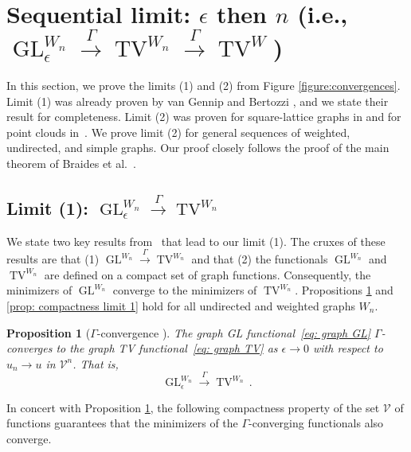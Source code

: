 \documentclass[11pt]{amsart}
\newtheorem{proposition}{Proposition}[section]
\def\ep{\epsilon}
\def\calV{\mathcal{V}}
\def\ra{\rightarrow}
\def\gamra{\stackrel{\Gamma}{\longrightarrow}}
\def\GL{\operatorname{GL}}
\def\TV{\operatorname{TV}}
\numberwithin{equation}{section}
\begin{document}
{{%

\section{\texorpdfstring{Sequential limit: $\ep$ then $n$ (i.e., $\GL^{W_n}_\ep \gamra \TV^{W_n} \gamra \TV^W$)}{Sequential limit: ep then n}}\label{sec: sequential ep then n}

In this section, we prove the limits (1) and (2) from Figure \ref{figure:convergences}. Limit (1) was already proven by van Gennip and Bertozzi \cite[Theorem 3.1]{van2012gamma}, and we state their result for completeness. Limit (2) was proven {for} square-lattice graphs in \cite[Theorem 4.3]{van2012gamma} and for point clouds in~\cite{garcia2016continuum}. We {prove limit (2) for} general sequences of {weighted, undirected, and simple} graphs. Our proof closely follows the proof of the main theorem of {Braides et al.}~\cite{braides2020cut}. 



\subsection{\texorpdfstring{Limit (1): $\GL^{W_n}_\ep \gamra \TV^{W_n}$}{Limit (1)}}

We state two key results from~\cite{van2012gamma} that lead to
our limit (1). The cruxes of these results are that (1) $\GL^{W_n} \gamra \TV^{W_n}$ and that (2) the functionals $\GL^{W_n}$ and $\TV^{W_n}$ are defined on a compact set of graph functions. Consequently, the minimizers of $\GL^{W_n}$ converge to the minimizers of $\TV^{W_n}$. 
Propositions \ref{prop: limit 1 convergence} and \ref{prop: compactness limit 1} hold for all {undirected and weighted} graphs $W_n$.




\begin{proposition}[{$\Gamma$-convergence} {\cite[Theorem 3.1]{van2012gamma}}] \label{prop: limit 1 convergence} 
The graph GL functional~\eqref{eq: graph GL} $\Gamma$-converges to the graph TV functional~\eqref{eq: graph TV} as $\ep \ra 0$ with respect to $u_n \ra u$ in $\mathcal{V}^n$. That is,
   \begin{equation}
     \GL^{W_n}_\ep \gamra \TV^{W_n} \,. 
    \end{equation}
\end{proposition}

In concert with Proposition \ref{prop: limit 1 convergence}, the following compactness property of the set $\calV$ of functions guarantees that the minimizers of the $\Gamma$-converging functionals also converge.


}}
\end{document}
